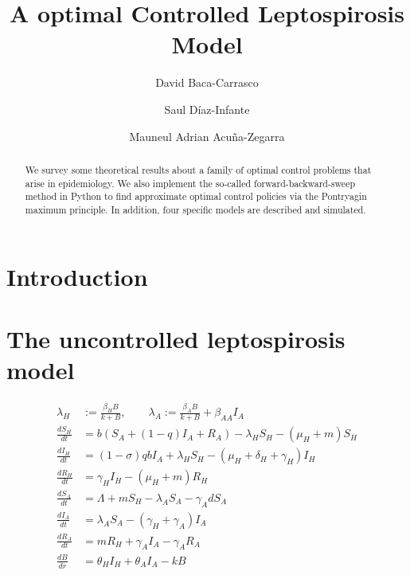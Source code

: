 \documentclass[11pt]{amsart}
\title[%
	A optimal Controlled Leptospirosis Model%
	]{
	A optimal Controlled Leptospirosis Model
}
\author[D. Baca]{David Baca-Carrasco}
\author[S. D\'iaz-Infante]{Saul D\'iaz-Infante}
\author[M.A. Acu\~{n}a]{Mauneul Adrian Acu\~{n}a-Zegarra}
\theoremstyle{definition}
\numberwithin{equation}{section}
\begin{document}
  \begin{abstract}
    We survey some theoretical results about a family of optimal 
    control problems that arise in epidemiology. We also implement the
    so-called forward-backward-sweep method in Python to find approximate
    optimal control policies via the Pontryagin maximum principle. 
    In addition, four specific models are described and simulated.
  \end{abstract}
\maketitle
%
  \section{Introduction}
 
  \section{The uncontrolled leptospirosis model}
      \begin{equation}
        \begin{aligned}
                \lambda_H &:= \frac{\beta_H B}{k + B}, \qquad
                \lambda_A := \frac{\beta_A B}{k + B} + \beta_{AA} I_A
                \\
                \frac{d S_H}{dt} &=
                    b (S_A + (1 - q) I_A + R_A)
                    - \lambda_H S_H - (\mu_H + m) S_H 
                \\
                \frac{d I_H}{dt} &=
                    (1 - \sigma)   q   b   I_A
                    + \lambda_H S_H - (\mu_H + \delta_H + \gamma_H)I_H
                \\
                \frac{d R_H}{dt} &=
                    \gamma_H I_H - (\mu_H + m) R_H
                \\
                \frac{dS_A}{dt} &=
                    \Lambda + m S_H - \lambda_A S_A - \gamma_A dS_A
                \\
                \frac{d I_A}{dt} &=
                    \lambda_A S_A - (\gamma_H + \gamma_A)   I_A
                \\
                \frac{dR_A}{dt} &=
                    m R_H + \gamma_A I_A - \gamma_A R_A
                \\
                \frac{dB}{dr} &=
                    \theta_H I_H + \theta_A I_A - k B
           \end{aligned}
      \end{equation}
\end{document}
